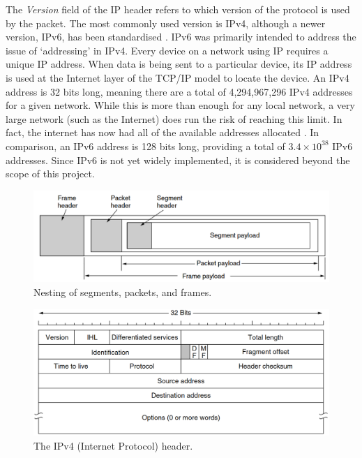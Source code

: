 The \textit{Version} field of the IP header refers to which version of the protocol is used by the packet.
The most commonly used version is IPv4, although a newer version, IPv6, has been standardised \cite{rfc1883} \cite{rfc8200}.
IPv6 was primarily intended to address the issue of `addressing' in IPv4.
Every device on a network using IP requires a unique IP address. When data is being sent to a particular device, its IP address is used at the Internet layer of the TCP/IP model to locate the device. An IPv4 address is 32 bits long, meaning there are a total of 4,294,967,296 IPv4 addresses for a given network. While this is more than enough for any local network, a very large network (such as the Internet) does run the risk of reaching this limit. In fact, the internet has now had all of the available addresses allocated \cite{iana_ipv4_address_space_registry}. In comparison, an IPv6 address is 128 bits long, providing a total of $3.4 \times 10^{38}$ IPv6 addresses. Since IPv6 is not yet widely implemented, it is considered beyond the scope of this project.

\begin{figure}[ht]
	\begin{center}
		\includegraphics[width=14cm]{frames.png}
	\end{center}
	\caption{Nesting of segments, packets, and frames. \cite{tanenbaum}}
	\label{segments_packets_frames}
\end{figure}

\begin{figure}[ht]
	\begin{center}
		\includegraphics[width=14cm]{ip_header.png}
	\end{center}
	\caption{The IPv4 (Internet Protocol) header. \cite{tanenbaum}}
	\label{ip_header}
\end{figure}

